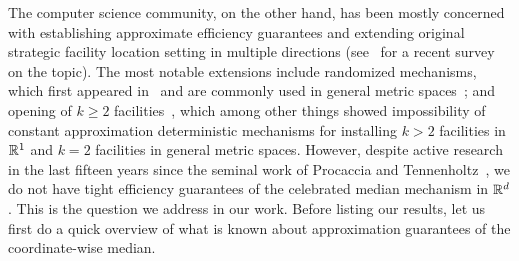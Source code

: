 The computer science community, on the other hand, has been mostly concerned with establishing approximate efficiency guarantees and extending original strategic facility location setting in multiple directions (see~\cite{chan2021mechanism} for a recent survey on the topic). The most notable extensions include randomized mechanisms, which  first appeared in~\cite{AlonFPT10} and are commonly used in general metric spaces~\cite{LuSWZ10,FotakisT10,FeldmanW13}; and 
opening of $k\ge 2$ facilities~\cite{procaccia2013approximate,lu2009,LuSWZ10,FotakisT10,EscoffierGTPS11,FotakisT16,walsh2020strategy}, which among other things showed impossibility of constant approximation deterministic mechanisms for installing $k>2$ facilities in ${\mathbb R}^1$ and $k=2$ facilities in general metric spaces.
However, despite active research in the last fifteen years since the seminal work of Procaccia and Tennenholtz~\cite{procaccia2013approximate}, we do not have tight efficiency guarantees of the celebrated median mechanism in ${\mathbb R}^d$. This is the question we address in our work. Before listing our results, let us first do a quick overview of what is known about approximation guarantees of the  coordinate-wise median.

